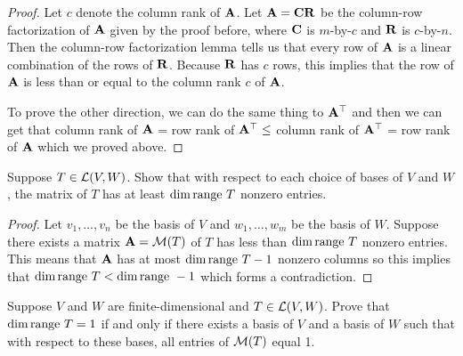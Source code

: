\documentclass{extarticle}
\begin{document}
\begin{proof}
Let \(c\) denote the column rank of \(\mathbf{A}\). Let \(\mathbf{A} = \mathbf{C} \mathbf{R}\) be the column-row factorization 
of \(\mathbf{A}\) given by the proof before, where \(\mathbf{C}\) is \(m\)-by-\(c\) and \(\mathbf{R}\) is \(c\)-by-\(n\). Then the 
column-row factorization lemma tells us that every row of \(\mathbf{A}\) is a linear combination of 
the rows of \(\mathbf{R}\). Because \(\mathbf{R}\) has \(c\) rows, this implies that the row of \(\mathbf{A}\) is 
less than or equal to the column rank \(c\) of \(\mathbf{A}\).

To prove the other direction, we can do the same thing to \(\mathbf{A}^\top\) and then we can get that 
column rank of \(\mathbf{A}\) = row rank of \(\mathbf{A}^\top \leq \) column rank of \(\mathbf{A}^\top\) = row 
rank of \(\mathbf{A}\) which we proved above. 
\end{proof}

\newpage 
{}
\begin{problem}{1}
    Suppose \(T \in \mathcal{L} (V, W)\). Show that with respect to each choice of bases of \(V\) and 
    \(W\), the matrix of \(T\) has at least \(\dim \text{range } T\) nonzero entries. 
\end{problem}

\begin{proof}
Let \(v_1, \ldots, v_n\) be the basis of \(V\) and \(w_1, \ldots, w_m\) be the basis of \(W\). 
Suppose there exists a matrix \(\mathbf{A} = \mathcal{M}(T)\) of \(T\) has less than \(\dim \text{range } T\) nonzero 
entries.  This means that \(\mathbf{A}\) has at most \(\dim \text{range } T - 1\) nonzero columns so this implies 
that \(\dim \text{range } T < \dim \text{range } - 1\) which forms a contradiction. 
\end{proof}

\begin{problem}{2}
    Suppose \(V\) and \(W\) are finite-dimensional and \(T \in \mathcal{L}(V, W)\). Prove that 
    \(\dim \text{range } T = 1\) if and only if there exists a basis of \(V\) and a basis of \(W\)
    such that with respect to these bases, all entries of \(\mathcal{M}(T)\) equal 1. 
\end{problem}
\end{document}

